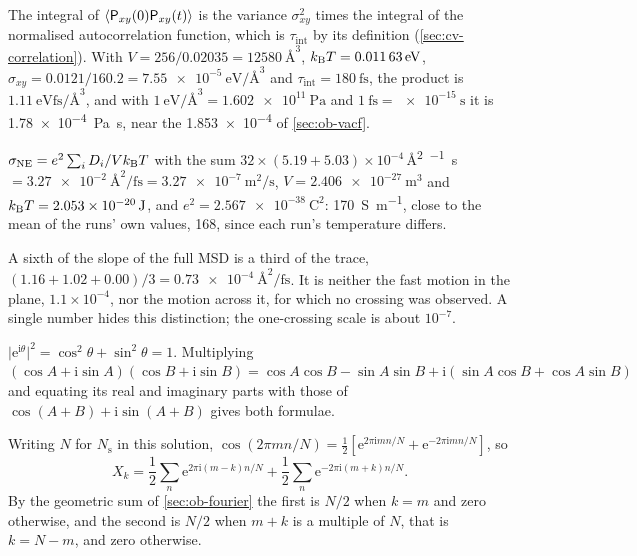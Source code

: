 The integral of $\langle \mathsf{P}_{xy}(0)\mathsf{P}_{xy}
(t) \rangle$ is the variance $\sigma_{xy}^2$ times the integral of the normalised
autocorrelation function, which is $\tau_{\mathrm{int}}$ by its definition
(\cref{sec:cv-correlation}). With $V = 256/0.02035 =
\SI{12580}{\angstrom\cubed}$, $k_{\mathrm{B}} T = \SI{0.01163}{\electronvolt}$,
$\sigma_{xy} = 0.0121/160.2 =
\SI{7.55e-5}{\electronvolt\per\angstrom\cubed}$
and $\tau_{\mathrm{int}} = \SI{180}{\femto\second}$, the product is
$\SI{1.11}{\electronvolt\femto\second\per\angstrom\cubed}$, and with
$\SI{1}{\electronvolt\per\angstrom\cubed} = \SI{1.602e11}{\pascal}$ and
$\SI{1}{\femto\second} = \SI{e-15}{\second}$ it is \SI{1.78e-4}{\pascal
\second}, near the \num{1.853e-4} of \cref{sec:ob-vacf}.

$\sigma_{\mathrm{NE}} = e^2\sum_iD_i/Vk_{\mathrm{B}} T$ with the
sum $32\times(5.19 + 5.03)\times10^{-4}$\,\si{\angstrom\squared\per\femto
\second} $= \SI{3.27e-2}{\angstrom\squared\per\femto\second} =
\SI{3.27e-7}{\metre\squared\per\second}$, $V = \SI{2.406e-27}{\metre\cubed}$
and $k_{\mathrm{B}} T = \SI{2.053e-20}{\joule}$, and $e^2 = \SI{2.567e-38}{\coulomb
\squared}$: \SI{170}{\siemens\per\metre}, close to the mean of the runs'
own values, 168, since each run's temperature differs.

A sixth of the slope of the full MSD is a third of
the trace, $(1.16 + 1.02 + 0.00)/3 = \SI{0.73e-4}{\angstrom\squared\per
\femto\second}$. It is neither the fast motion in the plane, $1.1\times
10^{-4}$, nor the motion across it, for which no crossing was observed. A single
number hides this distinction; the one-crossing scale is about $10^{-7}$.

$\lvert\mathrm{e}^{\mathrm{i}\theta}\rvert^2 =
\cos^2\theta + \sin^2\theta = 1$. Multiplying $(\cos A + \mathrm{i}\sin
A)(\cos B + \mathrm{i}\sin B) = \cos A\cos B - \sin A\sin B +
\mathrm{i}(\sin A\cos B + \cos A\sin B)$ and equating its real and
imaginary parts with those of $\cos(A + B) + \mathrm{i}\sin(A + B)$ gives
both formulae.

Writing $N$ for $N_{\mathrm s}$ in this solution,
$\cos(2\pi mn/N) = \frac12[\mathrm{e}^{2\pi\mathrm{i}mn/N} +
\mathrm{e}^{-2\pi\mathrm{i}mn/N}]$, so
\begin{equation*}
   X_k = \frac12\sum_n\mathrm{e}^{2\pi\mathrm{i}(m - k)n/N}
   + \frac12\sum_n\mathrm{e}^{-2\pi\mathrm{i}(m + k)n/N} .
\end{equation*}
By the geometric sum of \cref{sec:ob-fourier} the first is $N/2$ when $k =
m$ and zero otherwise, and the second is $N/2$ when $m + k$ is a multiple
of $N$, that is $k = N - m$, and zero otherwise.

